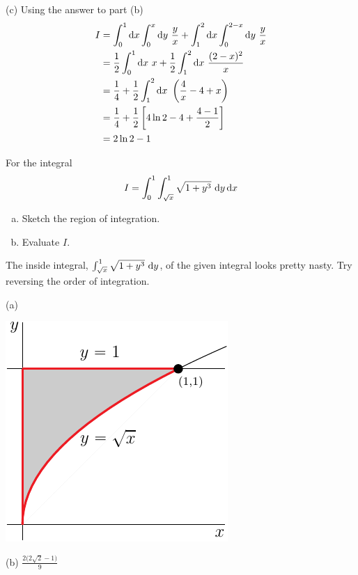 \begin{solution}
(c) Using the answer to part (b)
\begin{align*}
I&=\int_0^1\dee{x}\int_0^x\dee{y}\ \frac{y}{x}
  +\int_1^2\dee{x}\int_0^{2-x}\dee{y}\ \frac{y}{x} \\
&=\frac{1}{2}\int_0^1\dee{x}\ x
    +\frac{1}{2}\int_1^2\dee{x}\ \frac{(2-x)^2}{x}\\
&=\frac{1}{4} +\frac{1}{2}\int_1^2\dee{x}\ \left(\frac{4}{x}-4+x\right) \\
&=\frac{1}{4} +\frac{1}{2}\left[4\ln 2 -4 + \frac{4-1}{2}\right] \\
&=2\ln 2 -1
\end{align*}
\end{solution}

\begin{question}[M200 2010A] %
For the integral
\begin{equation*}
I = \int_0^1 \int_{\sqrt{x}}^1 \sqrt{1+y^3}\ \mathrm{d}y\,\mathrm{d}x
\end{equation*}
\begin{enumerate}[(a)]
\item
Sketch the region of integration.
\item
Evaluate $I$.
\end{enumerate}
\end{question}

\begin{hint}
The inside integral, $\int_{\sqrt{x}}^1 \sqrt{1+y^3}\ \mathrm{d}y$,
of the given integral looks pretty nasty. Try reversing the order of 
integration.
\end{hint}

\begin{answer}
(a)
\begin{center}
     \includegraphics{fig/OE10A_6.pdf}
\end{center}

(b) $\frac{2\big(2\sqrt{2}-1\big)}{9}$
\end{answer}

